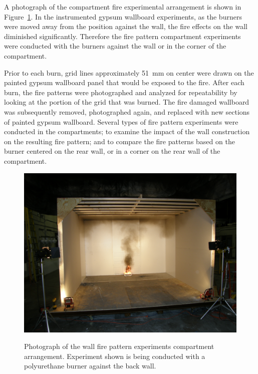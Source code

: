 \documentclass[twoside]{uocthesis}
\begin{document}
{A photograph of the compartment fire experimental arrangement is shown in Figure~\ref{Compartment_Test}. In the instrumented gypsum wallboard experiments, as the burners were moved away from the position against the wall, the fire effects on the wall diminished significantly.  Therefore the fire pattern compartment experiments were conducted with the burners against the wall or in the corner of the compartment.

Prior to each burn, grid lines approximately 51~mm on center were drawn on the painted gypsum wallboard panel that would be exposed to the fire.  After each burn, the fire patterns were photographed and analyzed for repeatability by looking at the portion of the grid that was burned. The fire damaged wallboard was subsequently removed, photographed again, and replaced with new sections of painted gypsum wallboard. Several types of fire pattern experiments were conducted in the compartments; to examine the impact of the wall construction on the resulting fire pattern; and to compare the fire patterns based on the burner centered on the rear wall, or in a corner on the rear wall of the compartment.

\begin{figure}[ht!]
\includegraphics[width=\columnwidth]{../Figures/Compartment_Test} \\
	\caption[Photograph of the wall fire pattern experiments compartment arrangement]{Photograph of the wall fire pattern experiments compartment arrangement.  Experiment shown is being conducted with a polyurethane burner against the back wall.}
	\label{Compartment_Test}
\end{figure}

}
\end{document}
